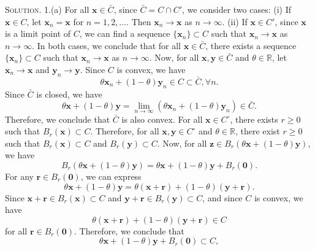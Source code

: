 \documentclass[12pt, a4paper, oneside]{ctexart}
\newenvironment{solution}{\par\noindent\textsc{Solution. }}{\\\par}
\begin{document}
\begin{solution}
	1.(a) For all $\mathbf{x} \in \bar{C}$, since $\bar{C} = C \cap C'$, we consider two cases:
	\newline
	(i) If $\mathbf{x} \in C$, let $\mathbf{x}_n = \mathbf{x}$ for $n = 1, 2, \dots$. Then $\mathbf{x}_n \rightarrow \mathbf{x}$ as $n \rightarrow \infty$.
	\newline
	(ii) If $\mathbf{x} \in C'$, since $\mathbf{x}$ is a limit point of $C$, we can find a sequence $\{\mathbf{x}_n\} \subset C$ such that $\mathbf{x}_n \rightarrow \mathbf{x}$ as $n \rightarrow \infty$.
	\newline
	In both cases, we conclude that for all $\mathbf{x} \in \bar{C}$, there exists a sequence $\{\mathbf{x}_n\} \subset C$ such that $\mathbf{x}_n \rightarrow \mathbf{x}$ as $n \rightarrow \infty$.
	\newline
	Now, for all $\mathbf{x}, \mathbf{y} \in \bar{C}$ and $\theta \in \mathbb{R}$, let $\mathbf{x}_n \rightarrow \mathbf{x}$ and $\mathbf{y}_n \rightarrow \mathbf{y}$. Since $C$ is convex, we have 
	\[
	\theta \mathbf{x}_n + (1 - \theta) \mathbf{y}_n \in C \subset \bar{C}, \forall n.
	\]
	Since $\bar{C}$ is closed, we have 
	\[
	\theta \mathbf{x} + (1 - \theta) \mathbf{y} = \lim_{n \rightarrow \infty} \left(\theta \mathbf{x}_n + (1 - \theta) \mathbf{y}_n\right) \in \bar{C}.
	\]
	Therefore, we conclude that $\bar{C}$ is also convex.
	\newline
	For all $\mathbf{x} \in C^\circ$, there exists $r \geq 0$ such that $B_r(\mathbf{x}) \subset C$. Therefore, for all $\mathbf{x}, \mathbf{y} \in C^\circ$ and $\theta \in \mathbb{R}$, there exist $r \geq 0$ such that $B_r(\mathbf{x}) \subset C$ and $B_r(\mathbf{y}) \subset C$. 
	\newline
	Now, for all $\mathbf{z} \in B_r(\theta \mathbf{x} + (1 - \theta) \mathbf{y})$, we have 
	\[
	B_r(\theta \mathbf{x} + (1 - \theta) \mathbf{y}) = \theta \mathbf{x} + (1 - \theta) \mathbf{y} + B_r(\mathbf{0}).
	\]
	For any $\mathbf{r} \in B_r(\mathbf{0})$, we can express 
	\[
	\theta \mathbf{x} + (1 - \theta) \mathbf{y} = \theta (\mathbf{x} + \mathbf{r}) + (1 - \theta)(\mathbf{y} + \mathbf{r}).
	\]
	Since $\mathbf{x} + \mathbf{r} \in B_r(\mathbf{x}) \subset C$ and $\mathbf{y} + \mathbf{r} \in B_r(\mathbf{y}) \subset C$, and since $C$ is convex, we have 
	\[
	\theta (\mathbf{x} + \mathbf{r}) + (1 - \theta)(\mathbf{y} + \mathbf{r}) \in C
	\]
	for all $\mathbf{r} \in B_r(\mathbf{0})$. Therefore, we conclude that 
	\[
	\theta \mathbf{x} + (1 - \theta) \mathbf{y} + B_r(\mathbf{0}) \subset C,
\]
\end{solution}
\end{document}
